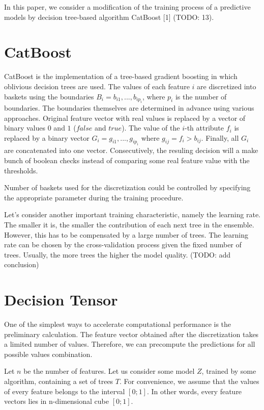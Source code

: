\documentclass[a4paper]{jpconf}
\begin{document}
In this paper, we consider a modification of the training process of a predictive models by decision tree-based algorithm CatBoost [1] (TODO: 13).
\section{CatBoost}

CatBoost is the implementation of a tree-based gradient boosting in which oblivious decision trees are used. The values of each feature $i$ are discretized into baskets using the boundaries $B_i={b_{i1},...,b_{ip_i}}$, where $p_i$ is the number of boundaries. The boundaries themselves are determined in advance using various approaches.
Original feature vector with real values is replaced by a vector of binary values $0$ and $1$ ($false$ and $true$). The value of the $i$-th attribute $f_i$ is replaced by a binary vector $G_i={g_{i1},...,g_{ip_i}}$ where $g_{ij} = f_i > b_{ij}$. Finally, all $G_i$ are concatenated into one vector. Consecutively, the resuling decision will a make bunch of boolean checks instead of comparing some real feature value with the thresholds.

Number of baskets used for the discretization could be controlled by specifying the appropriate parameter during the training procedure.

Let's consider another important training characteristic, namely the learning rate. The smaller it is, the smaller the contribution of each next tree in the ensemble. However, this has to be compensated by a large number of trees. The learning rate can be chosen by the cross-validation process given the fixed number of trees. Usually, the more trees the higher the model quality. (TODO: add conclusion)

\section{Decision Tensor}
One of the simplest ways to accelerate computational performance is the preliminary calculation. The feature vector obtained after the discretization takes a limited number of values. Therefore, we can precompute the predictions for all possible values combination.

Let $n$ be the number of features. Let us consider some model $Z$, trained by some algorithm, containing a set of trees $T$. For convenience, we assume that the values of every feature belongs to the interval $[0;1]$. In other words, every feature vectors lies in n-dimensional cube $[0;1]$.
\end{document}
